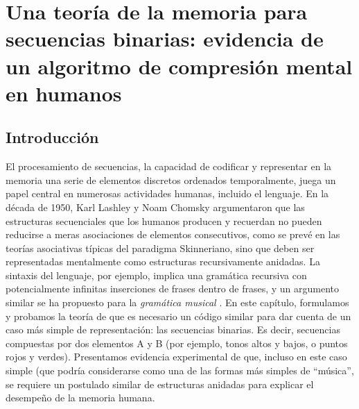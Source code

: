 \chapter{Una teoría de la memoria para secuencias binarias: evidencia de un algoritmo de compresión mental en humanos}

\section{Introducción}


El procesamiento de secuencias, la capacidad de codificar y representar en la memoria una serie de elementos discretos ordenados temporalmente, juega un papel central en numerosas actividades humanas, incluido el lenguaje. En la década de 1950, Karl Lashley \cite{f1} y Noam Chomsky \cite{f2} argumentaron que las estructuras secuenciales que los humanos producen y recuerdan no pueden reducirse a meras asociaciones de elementos consecutivos, como se prevé en las teorías asociativas típicas del paradigma Skinneriano, sino que deben ser representadas mentalmente como estructuras recursivamente anidadas. La sintaxis del lenguaje, por ejemplo, implica una gramática recursiva con potencialmente infinitas inserciones de frases dentro de frases, y un argumento similar se ha propuesto para la \textit{gramática musical} \cite{f3}. En este capítulo, formulamos y probamos la teoría de que es necesario un código similar para dar cuenta de un caso más simple de representación: las secuencias binarias. Es decir, secuencias compuestas por dos elementos A y B (por ejemplo, tonos altos y bajos, o puntos rojos y verdes). Presentamos evidencia experimental de que, incluso en este caso simple (que podría considerarse como una de las formas más simples de ``música'', se requiere un postulado similar de estructuras anidadas para explicar el desempeño de la memoria humana.


